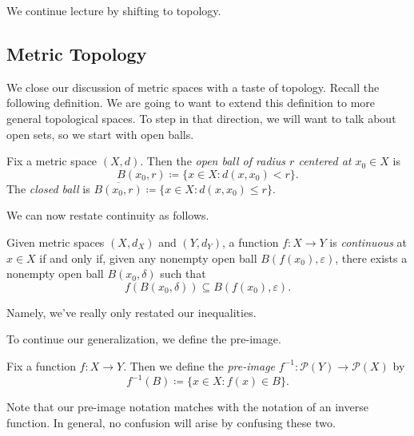 \documentclass[../notes.tex]{subfiles}
\begin{document}
We continue lecture by shifting to topology.

\subsection{Metric Topology}
We close our discussion of metric spaces with a taste of topology. Recall the following definition.
\contdef*
\noindent We are going to want to extend this definition to more general topological spaces. To step in that direction, we will want to talk about open sets, so we start with open balls.
\begin{definition}[Ball]
	Fix a metric space $(X,d)$. Then the \textit{open ball of radius $r$ centered at $x_0\in X$} is
	\[B(x_0,r)\coloneqq\{x\in X:d(x,x_0)<r\}.\]
	The \textit{closed ball} is $\overline{B(x_0,r)}\coloneqq\{x\in X:d(x,x_0)\le r\}$.
\end{definition}
We can now restate continuity as follows.
\begin{defihelper}[Continuous]
	Given metric spaces $(X,d_X)$ and $(Y,d_Y)$, a function $f\colon X\to Y$ is \textit{continuous} at $x\in X$ if and only if, given any nonempty open ball $B(f(x_0),\varepsilon)$, there exists a nonempty open ball $B(x_0,\delta)$ such that
	\[f(B(x_0,\delta))\subseteq B(f(x_0),\varepsilon).\]
\end{defihelper}
Namely, we've really only restated our inequalities.

To continue our generalization, we define the pre-image.
\begin{definition}
	Fix a function $f\colon X\to Y$. Then we define the \textit{pre-image} $f^{-1}\colon\mathcal P(Y)\to\mathcal P(X)$ by
	\[f^{-1}(B)\coloneqq\{x\in X:f(x)\in B\}.\]
\end{definition}
Note that our pre-image notation matches with the notation of an inverse function. In general, no confusion will arise by confusing these two.
\end{document}
